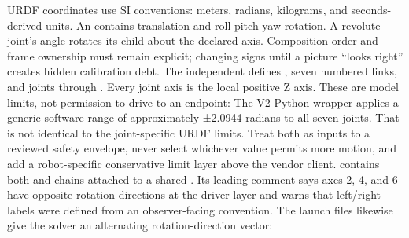 {}URDF coordinates use SI conventions: meters, radians, kilograms, and seconds-derived units. An  contains  translation and roll-pitch-yaw rotation. A revolute joint's angle rotates its child about the declared axis. Composition order and frame ownership must remain explicit; changing signs until a picture “looks right” creates hidden calibration debt.\markdownRendererInterblockSeparator
{}\markdownRendererSectionBegin
{}\markdownRendererInterblockSeparator
{}The independent  defines , seven numbered links, and joints  through . Every joint axis is the local positive Z axis. These are model limits, not permission to drive to an endpoint:\markdownRendererInterblockSeparator
{}\markdownRendererInterblockSeparator
{}The V2 Python wrapper applies a generic software range of approximately ±2.0944 radians to all seven joints. That is not identical to the joint-specific URDF limits. Treat both as inputs to a reviewed safety envelope, never select whichever value permits more motion, and add a robot-specific conservative limit layer above the vendor client.\markdownRendererInterblockSeparator
{}
\markdownRendererSectionEnd \markdownRendererSectionBegin
{}\markdownRendererInterblockSeparator
{} contains both  and  chains attached to a shared . Its leading comment says axes 2, 4, and 6 have opposite rotation directions at the driver layer and warns that left/right labels were defined from an observer-facing convention. The launch files likewise give the solver an alternating rotation-direction vector:\markdownRendererInterblockSeparator
